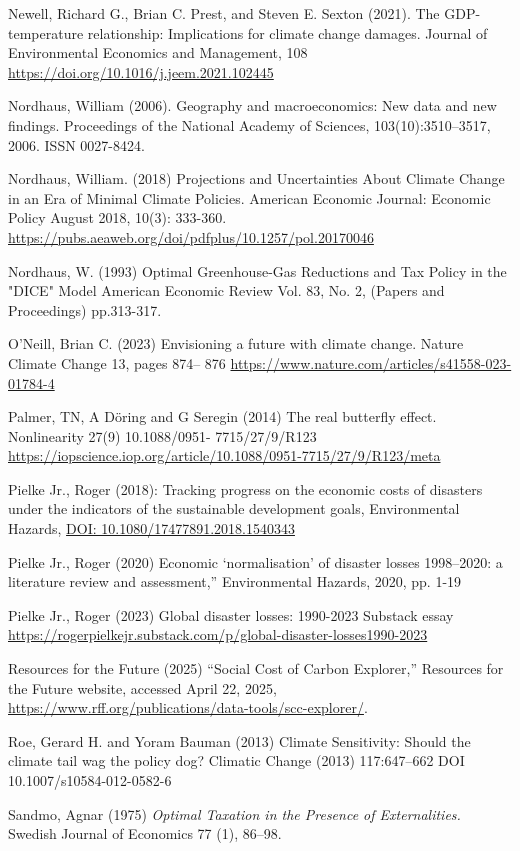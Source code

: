 \documentclass[12pt,paper=a4,DIV=12,parskip=never,chapterprefix=false,headings=standardclasses]{scrreprt}
\begin{document}
Newell, Richard G., Brian C. Prest, and Steven E. Sexton (2021). The GDP-temperature relationship:
Implications for climate change damages. Journal of Environmental Economics and Management, 108
\url{https://doi.org/10.1016/j.jeem.2021.102445}

Nordhaus, William (2006). Geography and macroeconomics: New data and new findings. Proceedings of
the National Academy of Sciences, 103(10):3510–3517, 2006. ISSN 0027-8424.

Nordhaus, William. (2018) Projections and Uncertainties About Climate Change in an Era of Minimal
Climate Policies. American Economic Journal: Economic Policy August 2018, 10(3): 333-360.
\url{https://pubs.aeaweb.org/doi/pdfplus/10.1257/pol.20170046}

Nordhaus, W. (1993) Optimal Greenhouse-Gas Reductions and Tax Policy in the "DICE" Model
American Economic Review Vol. 83, No. 2, (Papers and Proceedings) pp.313-317.

O’Neill, Brian C. (2023) Envisioning a future with climate change. Nature Climate Change 13, pages 874–
876 \url{https://www.nature.com/articles/s41558-023-01784-4}

Palmer, TN, A Döring and G Seregin (2014) The real butterfly effect. Nonlinearity 27(9) 10.1088/0951-
7715/27/9/R123 \url{https://iopscience.iop.org/article/10.1088/0951-7715/27/9/R123/meta}

Pielke Jr., Roger (2018): Tracking progress on the economic costs of disasters under the indicators of the
sustainable development goals, Environmental Hazards, \url{DOI: 10.1080/17477891.2018.1540343}

Pielke Jr., Roger (2020) Economic ‘normalisation’ of disaster losses 1998–2020: a literature review and
assessment,” Environmental Hazards, 2020, pp. 1-19

Pielke Jr., Roger (2023) Global disaster losses: 1990-2023 Substack essay
\url{https://rogerpielkejr.substack.com/p/global-disaster-losses1990-2023}

Resources for the Future (2025) “Social Cost of Carbon Explorer,” Resources for the Future website,
accessed April 22, 2025, \url{https://www.rff.org/publications/data-tools/scc-explorer/}.

Roe, Gerard H. and Yoram Bauman (2013) Climate Sensitivity: Should the climate tail wag the policy
dog? Climatic Change (2013) 117:647–662 DOI 10.1007/s10584-012-0582-6

Sandmo, Agnar (1975) \emph{Optimal Taxation in the Presence of Externalities.} Swedish Journal of Economics
77 (1), 86–98.
\end{document}
